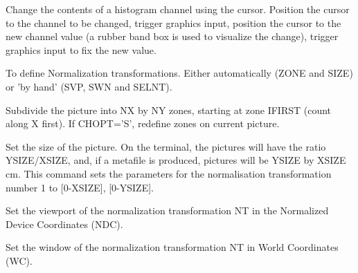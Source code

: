 \BEGTEXT
Change the contents of a histogram channel using the cursor.
Position the cursor to the channel to be changed, trigger graphics input,
position the cursor to the new channel value
(a rubber band box is used to visualize the change), trigger graphics input
to fix the new value.
\ENDTEXT


\BEGTEXT
To define Normalization transformations.
Either automatically (ZONE and SIZE) or 'by hand' (SVP, SWN and SELNT).
\ENDTEXT

\BEGARG
{}
\ENDARG
\BEGTEXT
Subdivide the picture into NX by NY zones,
starting at zone IFIRST (count along X first).
If CHOPT='S', redefine zones on current picture.
\ENDTEXT

\BEGARG
{}
\ENDARG
\BEGTEXT
Set the size of the picture.
On the terminal, the pictures will have the ratio YSIZE/XSIZE, and,
if a metafile is produced, pictures will be YSIZE by XSIZE cm.
This command sets the parameters for the normalisation transformation
number 1 to [0-XSIZE], [0-YSIZE].
\ENDTEXT

\BEGARG
{}
\ENDARG
\BEGTEXT
Set the viewport of the normalization transformation NT
in the Normalized Device Coordinates (NDC).
\ENDTEXT

\BEGARG
{}
\ENDARG
\BEGTEXT
Set the window of the normalization transformation NT
in World Coordinates (WC).
\ENDTEXT

